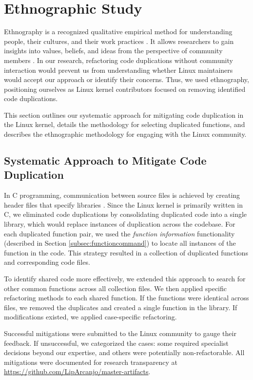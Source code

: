 \section{Ethnographic Study}

\label{sec:meteth}

Ethnography is a recognized qualitative empirical method for understanding people, their cultures, and their work practices \citep{bookethno}. It allows researchers to gain insights into values, beliefs, and ideas from the perspective of community members \citep{ethnosoft}. In our research, refactoring code duplications without community interaction would prevent us from understanding whether Linux maintainers would accept our approach or identify their concerns. Thus, we used ethnography, positioning ourselves as Linux kernel contributors focused on removing identified code duplications.

This section outlines our systematic approach for mitigating code duplication in the Linux kernel, details the methodology for selecting duplicated functions, and describes the ethnographic methodology for engaging with the Linux community.

\subsection{Systematic Approach to Mitigate Code Duplication}
\label{subsec:pipeline}

In C programming, communication between source files is achieved by creating header files that specify libraries \citep{Cbook}. Since the Linux kernel is primarily written in C, we eliminated code duplications by consolidating duplicated code into a single library, which would replace instances of duplication across the codebase.
%
For each duplicated function pair, we used the \textit{function information} functionality (described in Section \ref{subsec:functioncommand}) to locate all instances of the function in the code. This strategy resulted in a collection of duplicated functions and corresponding code files.

To identify shared code more effectively, we extended this approach to search for other common functions across all collection files. We then applied specific refactoring methods to each shared function. If the functions were identical across files, we removed the duplicates and created a single function in the library. If modifications existed, we applied case-specific refactoring.

Successful mitigations were submitted to the Linux community to gauge their feedback. If unsuccessful, we categorized the cases: some required specialist decisions beyond our expertise, and others were potentially non-refactorable. All mitigations were documented for research transparency at \url{https://github.com/LipArcanjo/master-artifacts}.

